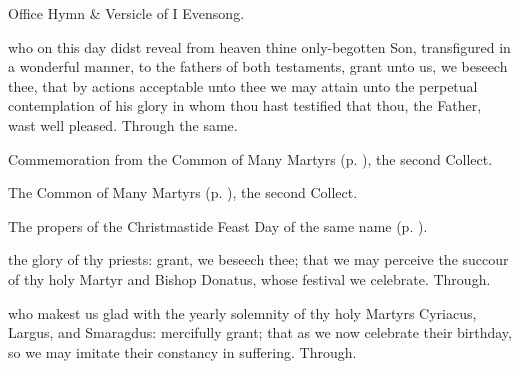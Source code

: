 \begin{rubric}
	Office Hymn \& Versicle of I Evensong.
\end{rubric}



\collect
{} who on this day didst reveal from heaven thine only-begotten Son, transfigured in a wonderful manner, to the fathers of both testaments, grant unto us, we beseech thee, that by actions acceptable unto thee we may attain unto the perpetual contemplation of his glory in whom thou hast testified that thou, the Father, wast well pleased. Through the same.

\begin{rubric}
	 Commemoration  from the Common of Many Martyrs (p. \pageref{CommonMartyrsNotBishopsCollect}), the second Collect.
\end{rubric}


\clearpage
{}

\begin{rubric}
	The Common of Many Martyrs (p. \pageref{CommonMartyrsNotBishopsCollect}), the second Collect.
\end{rubric}



\begin{rubric}
    The propers of the Christmastide Feast Day of the same name (p. \pageref{MostHolyName}).
\end{rubric}



\memorialCollect
{} the glory of thy priests: grant, we beseech thee; that we may perceive the succour of thy holy Martyr and Bishop Donatus, whose festival we celebrate. Through.



\memorialCollect
{} who makest us glad with the yearly solemnity of thy holy Martyrs Cyriacus, Largus, and Smaragdus: mercifully grant; that as we now celebrate their birthday, so we may imitate their constancy in suffering. Through.

